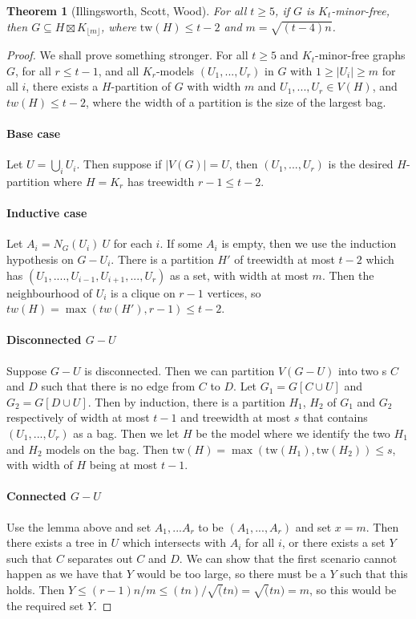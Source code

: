 \documentclass[]{article}
\newcommand{\tw}{\text{tw}}
\newtheorem{theorem}{Theorem}
\theoremstyle{definition}
\numberwithin{theorem}{section}
\numberwithin{equation}{section}
\begin{document}
\begin{theorem}[Illingsworth, Scott, Wood]
	For all $t \geq 5$, if $G$ is $K_t$-minor-free, then $G \subseteq H \boxtimes K_{\lfloor m \rfloor}$, where $\tw(H) \leq t-2$ and $m = \sqrt{(t-4)n}$.
\end{theorem}
\begin{proof}
	We shall prove something stronger. For all $t \geq 5$ and $K_t$-minor-free graphs $G$, for all $r \leq t - 1$, and all $K_r$-models $(U_1, ..., U_r)$ in $G$ with $1 \geq |U_i| \geq m$ for all $i$, there exists a $H$-partition of $G$ with width $m$ and $U_1, ..., U_r \in V(H)$, and $tw(H) \leq t-2$, where the width of a partition is the size of the largest bag.
	\paragraph{Base case}
	Let $U = \bigcup_i U_i$. Then suppose if $|V(G)| = U$, then $(U_1, ..., U_r)$ is the desired $H$-partition where $H = K_r$ has treewidth $r-1 \leq t-2$. 
	\paragraph{Inductive case}
	Let $A_i = N_G(U_i) \ U$ for each $i$. If some $A_i$ is empty, then we use the induction hypothesis on $G - U_i$. There is a partition $H'$ of treewidth at most $t-2$ which has $(U_1, ...., U_{i-1}, U_{i+1}, ..., U_{r})$ as a set, with width at most $m$. Then the neighbourhood of $U_i$ is a clique on $r-1$ vertices, so $tw(H) = \max(tw(H'), r-1) \leq t - 2$. 
	\paragraph{Disconnected $G-U$}
	Suppose $G - U$ is disconnected. Then we can partition $V(G - U)$ into two s $C$ and $D$ such that there is no edge from $C$ to $D$. Let $G_1 = G[C \cup U]$ and $G_2 = G[D \cup U]$. Then by induction, there is a partition $H_1$, $H_2$ of $G_1$ and $G_2$ respectively of width at most $t-1$ and treewidth at most $s$ that contains $(U_1, ..., U_r)$ as a bag. Then we let $H$ be the model where we identify the two $H_1$ and $H_2$ models on the bag. Then $\tw(H) = \max(\tw(H_1), \tw(H_2)) \leq s$, with width of $H$ being at most $t-1$.
	\paragraph{Connected $G-U$}
	Use the lemma above and set $A_1, ... A_r$ to be $(A_1, ..., A_r)$ and set $x = m$. Then there exists a tree in $U$ which intersects with $A_i$ for all $i$, or there exists a set $Y$ such that $C$ separates out $C$ and $D$. We can show that the first scenario cannot happen as we have that $Y$ would be too large, so there must be a $Y$ such that this holds. Then $Y \leq (r-1)n/m \leq (tn)/\sqrt(tn) = \sqrt(tn) = m$, so this would be the required set $Y$. 
\end{proof}
\end{document}
